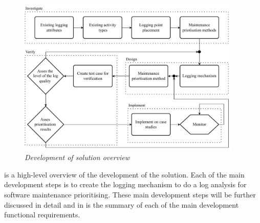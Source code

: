 \begin{figure}[!htb]
	\centering %
	\includegraphics[width=0.95\textwidth]{img/Chapter2/developmentOfSolution/developementOfSolution.pdf}
	\caption[Development of solution overview]
	{\textit{Development of solution overview}}\label{fig:ch2_developmentOfSolution}
\end{figure}

 is a high-level overview of the development of the solution. Each of the main development steps is to create the logging mechanism to do a log analysis for software maintenance prioritising. These main development steps will be further discussed in detail and in  is the summary of each of the main development functional requirements.

